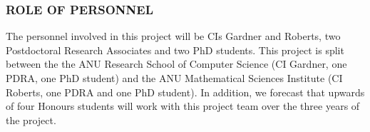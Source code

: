 \documentclass[a4paper,fontsize=12pt]{scrartcl}
\begin{document}





\subsubsection*{ROLE OF PERSONNEL}

%


The personnel involved in this project will be  CIs Gardner and Roberts, two Postdoctoral Research Associates and two PhD
students. This project is split  between the the  ANU Research School of Computer Science (CI Gardner, one PDRA, one PhD student) and the ANU Mathematical Sciences Institute (CI Roberts, one PDRA and one PhD student). In addition, we forecast that upwards of four  Honours students will work with this project team over the three years of the project.
\end{document}
